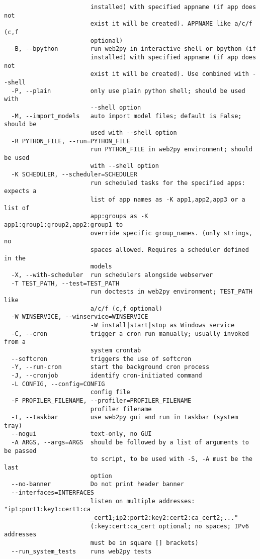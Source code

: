 \documentclass[justified,sixbynine,notoc]{tufte-book}
\begin{document}
\begin{fullwidth}
\begin{lstlisting}
                        installed) with specified appname (if app does not
                        exist it will be created). APPNAME like a/c/f (c,f
                        optional)
  -B, --bpython         run web2py in interactive shell or bpython (if
                        installed) with specified appname (if app does not
                        exist it will be created). Use combined with --shell
  -P, --plain           only use plain python shell; should be used with
                        --shell option
  -M, --import_models   auto import model files; default is False; should be
                        used with --shell option
  -R PYTHON_FILE, --run=PYTHON_FILE
                        run PYTHON_FILE in web2py environment; should be used
                        with --shell option
  -K SCHEDULER, --scheduler=SCHEDULER
                        run scheduled tasks for the specified apps: expects a
                        list of app names as -K app1,app2,app3 or a list of
                        app:groups as -K app1:group1:group2,app2:group1 to
                        override specific group_names. (only strings, no
                        spaces allowed. Requires a scheduler defined in the
                        models
  -X, --with-scheduler  run schedulers alongside webserver
  -T TEST_PATH, --test=TEST_PATH
                        run doctests in web2py environment; TEST_PATH like
                        a/c/f (c,f optional)
  -W WINSERVICE, --winservice=WINSERVICE
                        -W install|start|stop as Windows service
  -C, --cron            trigger a cron run manually; usually invoked from a
                        system crontab
  --softcron            triggers the use of softcron
  -Y, --run-cron        start the background cron process
  -J, --cronjob         identify cron-initiated command
  -L CONFIG, --config=CONFIG
                        config file
  -F PROFILER_FILENAME, --profiler=PROFILER_FILENAME
                        profiler filename
  -t, --taskbar         use web2py gui and run in taskbar (system tray)
  --nogui               text-only, no GUI
  -A ARGS, --args=ARGS  should be followed by a list of arguments to be passed
                        to script, to be used with -S, -A must be the last
                        option
  --no-banner           Do not print header banner
  --interfaces=INTERFACES
                        listen on multiple addresses: "ip1:port1:key1:cert1:ca
                        _cert1;ip2:port2:key2:cert2:ca_cert2;..."
                        (:key:cert:ca_cert optional; no spaces; IPv6 addresses
                        must be in square [] brackets)
  --run_system_tests    runs web2py tests
\end{lstlisting}


\end{fullwidth}
\end{document}
